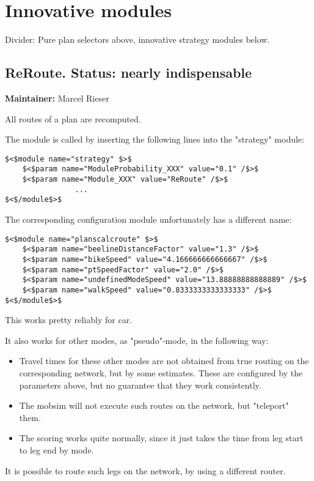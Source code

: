 \documentclass[a4paper,11pt]{report}
\begin{document}
\vfill\eject
\section{Innovative modules}


Divider: Pure plan selectors above, innovative strategy modules below.

\subsection{ReRoute.  Status: nearly indispensable}

\textbf{Maintainer:} Marcel Rieser

All routes of a plan are recomputed.

The module is called by inserting the following lines into the "strategy" module:
\begin{verbatim}
$<$module name="strategy" $>$
	$<$param name="ModuleProbability_XXX" value="0.1" /$>$
	$<$param name="Module_XXX" value="ReRoute" /$>$
                ...
$<$/module$>$
\end{verbatim}

The corresponding configuration module unfortunately has a different name:
\begin{verbatim}
$<$module name="planscalcroute" $>$
	$<$param name="beelineDistanceFactor" value="1.3" /$>$
	$<$param name="bikeSpeed" value="4.166666666666667" /$>$
	$<$param name="ptSpeedFactor" value="2.0" /$>$
	$<$param name="undefinedModeSpeed" value="13.88888888888889" /$>$
	$<$param name="walkSpeed" value="0.8333333333333333" /$>$
$<$/module$>$
\end{verbatim}

This works pretty reliably for car.

It also works for other modes, as "pseudo"-mode, in the following way:
\begin{itemize}
	\item Travel times for these other modes are not obtained from true  routing on the corresponding network, but by some estimates. These  are configured by the parameters above, but no guarantee that they work  consistently.
	\item The mobsim will not execute such routes on the network, but "teleport" them.
	\item The scoring works quite normally, since it just takes the time from leg start to leg end by mode.
\end{itemize}

It is possible to route such legs on the network, by using a different router.
\end{document}
